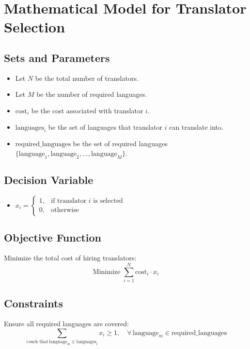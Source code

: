 \documentclass{article}
\begin{document}
\section*{Mathematical Model for Translator Selection}

\subsection*{Sets and Parameters}
\begin{itemize}
    \item Let \( N \) be the total number of translators.
    \item Let \( M \) be the number of required languages.
    \item \( \text{cost}_i \) be the cost associated with translator \( i \).
    \item \( \text{languages}_i \) be the set of languages that translator \( i \) can translate into.
    \item \( \text{required\_languages} \) be the set of required languages \(\{ \text{language}_1, \text{language}_2, \ldots, \text{language}_M \}\).
\end{itemize}

\subsection*{Decision Variable}
\begin{itemize}
    \item \( x_i = 
    \begin{cases} 
        1, & \text{if translator } i \text{ is selected} \\ 
        0, & \text{otherwise} 
    \end{cases} \)
\end{itemize}

\subsection*{Objective Function}
Minimize the total cost of hiring translators:
\[
\text{Minimize } \sum_{i=1}^{N} \text{cost}_i \cdot x_i
\]

\subsection*{Constraints}
Ensure all required languages are covered:
\[
\sum_{i \, \text{such that} \, \text{language}_m \in \text{languages}_i} x_i \geq 1, \quad \forall \, \text{language}_m \in \text{required\_languages}
\]
\end{document}
